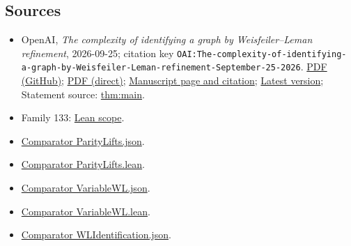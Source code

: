 \documentclass[11pt]{article}
\begin{document}
\subsection{Sources}
\begin{itemize}
\item OpenAI, \emph{The complexity of identifying a graph by Weisfeiler–Leman refinement}, 2026-09-25; citation key \texttt{OAI:The-complexity-of-identifying-a-graph-by-Weisfeiler-Leman-refinement-September-25-2026}. \href{https://github.com/openai/math/blob/adc7f1241b42e322a6451854ab7e4b4c146bf78a/preprints/The-complexity-of-identifying-a-graph-by-Weisfeiler-Leman-refinement-September-25-2026/paper.pdf}{PDF (GitHub)}; \href{https://github.com/openai/math/raw/adc7f1241b42e322a6451854ab7e4b4c146bf78a/preprints/The-complexity-of-identifying-a-graph-by-Weisfeiler-Leman-refinement-September-25-2026/paper.pdf}{PDF (direct)}; \href{https://github.com/openai/math/blob/adc7f1241b42e322a6451854ab7e4b4c146bf78a/preprints/The-complexity-of-identifying-a-graph-by-Weisfeiler-Leman-refinement-September-25-2026/README.md}{Manuscript page and citation}; \href{https://github.com/openai/math/blob/main/preprints/The-complexity-of-identifying-a-graph-by-Weisfeiler-Leman-refinement-September-25-2026/paper.pdf}{Latest version}; Statement source: \href{https://github.com/openai/math/blob/adc7f1241b42e322a6451854ab7e4b4c146bf78a/preprints/The-complexity-of-identifying-a-graph-by-Weisfeiler-Leman-refinement-September-25-2026/build/sections/01-introduction.tex\#L36}{thm:main}.
\item Family 133: \href{https://github.com/openai/math/blob/adc7f1241b42e322a6451854ab7e4b4c146bf78a/lean/docs/133.md}{Lean scope}.
\item \href{https://github.com/openai/math/blob/adc7f1241b42e322a6451854ab7e4b4c146bf78a/lean/ComparatorChallenges/ParityLifts.json}{Comparator ParityLifts.json}.
\item \href{https://github.com/openai/math/blob/adc7f1241b42e322a6451854ab7e4b4c146bf78a/lean/ComparatorChallenges/ParityLifts.lean}{Comparator ParityLifts.lean}.
\item \href{https://github.com/openai/math/blob/adc7f1241b42e322a6451854ab7e4b4c146bf78a/lean/ComparatorChallenges/VariableWL.json}{Comparator VariableWL.json}.
\item \href{https://github.com/openai/math/blob/adc7f1241b42e322a6451854ab7e4b4c146bf78a/lean/ComparatorChallenges/VariableWL.lean}{Comparator VariableWL.lean}.
\item \href{https://github.com/openai/math/blob/adc7f1241b42e322a6451854ab7e4b4c146bf78a/lean/ComparatorChallenges/WLIdentification.json}{Comparator WLIdentification.json}.

\end{itemize}
\end{document}
